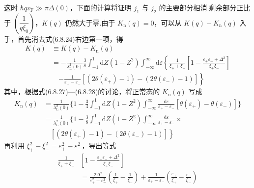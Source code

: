 这时 $\hbar qv_{\mathrm{F}}\gg\pi\Delta(0)$，下面的计算将证明 $j_{1}$ 与 $j_{2}$ 的主要部分相消.剩余部分正比于 $\left(\dfrac{1}{q\xi_{0}}\right)$，$K(q)$ 仍然大于零.由于 $K_{\mathrm{n}}(q)=0$，可以从 $K(q)-K_{\mathrm{n}}(q)$ 入手，首先消去式(6.8.24)右边第一项，得
\begin{equation}
\begin{aligned}
  K(q)&\equiv K(q)-K_{\mathrm{n}}(q)\\
  &=-\frac{1}{\lambda_{\mathrm{L}}^{2}(0)}\frac{3}{8}
  \int_{-1}^{1}\mathrm{d}Z\left(1-Z^{2}\right)
  \int_{-\infty}^{\infty}\mathrm{d}\varepsilon
  \left\{\frac{1}{\xi_{+}+\xi_{-}}
  \left[1-\frac{\varepsilon_{+}\varepsilon_{-}+\Delta^{2}}{\xi_{+}\xi_{-}}\right]\right.\\
  &\quad\left.-\frac{1}{\varepsilon_{+}-\varepsilon_{-}}
  \left[\left(2\theta(\varepsilon_{+})-1\right)
  -\left(2\theta(\varepsilon_{-})-1\right)\right]\right\}
\end{aligned}
\end{equation}
其中，根据式(6.8.27)—(6.8.28)的讨论，将正常态的 $K_{\mathrm{n}}(q)$ 写成
\begin{equation*}
\begin{aligned}
  K_{\mathrm{n}}(q)&=\frac{1}{\lambda_{\mathrm{L}}^{2}(0)}\biggl\{1-\frac{3}{4}
  \int_{-1}^{1}\mathrm{d}Z\left(1-Z^{2}\right)
  \int_{-\infty}^{\infty}\frac{\mathrm{d}\varepsilon}{\varepsilon_{+}-\varepsilon_{-}}
  \left[\theta(\varepsilon_{+})-\theta(\varepsilon_{-})\right]\biggr\}\\
  &=\frac{1}{\lambda_{\mathrm{L}}^{2}(0)}\biggl\{1-\frac{3}{8}
  \int_{-1}^{1}\mathrm{d}Z\left(1-Z^{2}\right)
  \int_{-\infty}^{\infty}\frac{\mathrm{d}\varepsilon}{\varepsilon_{+}-\varepsilon_{-}}\times\\
  &\quad\left.\left[\left(2\theta(\varepsilon_{+})-1\right)
  -\left(2\theta(\varepsilon_{-})-1\right)\right]\right\}
\end{aligned}
\end{equation*}
再利用 $\xi_{+}^{2}-\xi_{-}^{2}=\varepsilon_{+}^{2}-\varepsilon_{-}^{2}$，导出等式
\begin{equation}
\begin{aligned}
  \frac{1}{\xi_{+}+\xi_{-}}
  &\left[1-\frac{\varepsilon_{+}\varepsilon_{-}+\Delta^{2}}{\xi_{+}\xi_{-}}\right]\\
  &=\frac{2\Delta^{2}}{\varepsilon_{+}^{2}-\varepsilon_{-}^{2}}
  \left(\frac{1}{\xi_{+}}-\frac{1}{\xi_{-}}\right)
  +\frac{1}{\varepsilon_{+}-\varepsilon_{-}}
  \left(\frac{\varepsilon_{+}}{\xi_{+}}-\frac{\varepsilon_{-}}{\xi_{-}}\right)
\end{aligned}
\end{equation}
